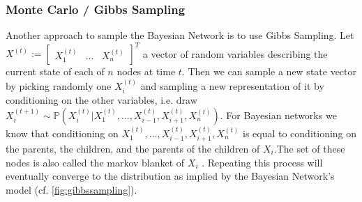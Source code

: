 \documentclass{article}
\begin{document}
\subsubsection{Monte Carlo / Gibbs Sampling}
Another approach to sample the Bayesian Network is to use Gibbs Sampling. Let $X^{(t)} := \begin{bmatrix} X_1^{(t)} &  ... & X_n^{(t)} \end{bmatrix}^T$ a vector of random variables describing the current state of each of $n$ nodes at time $t$. Then we can sample a new state vector by picking randomly one $X_i^{(t)}$ and sampling a new representation of it by conditioning on the other variables, i.e. draw $X_i^{(t+1)} \sim \mathbb{P}(X_i^{(t)} \vert X_1^{(t)} , ..., X_{i-1}^{(t)},X_{i+1}^{(t)}, X_{n}^{(t)})$. For Bayesian networks we know that conditioning on $X_1^{(t)} , ..., X_{i-1}^{(t)},X_{i+1}^{(t)}, X_{n}^{(t)}$ is equal to conditioning on the parents, the children, and the parents of the children of $X_i$.The set of these nodes is also called the markov blanket of $X_i$ \cite{gibbsnips}. Repeating this process will eventually converge to the distribution as implied by the Bayesian Network's model (cf. \autoref{fig:gibbssampling}).
\end{document}
